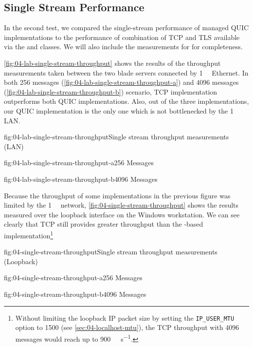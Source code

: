 \subsection{Single Stream Performance}

In the second test, we compared the single-stream performance of managed QUIC implementations to the
performance of combination of TCP and TLS available via the \TcpClient{} and \SslStream{} \dotnet{}
classes. We will also include the measurements for \libmsquic{} for completeness.

\autoref{fig:04-lab-single-stream-throughput} shows the results of the throughput measurements taken
between the two blade servers connected by \SI{1}{\giga\bit} Ethernet. In both \SI{256}{\byte}
messages (\autoref{fig:04-lab-single-stream-throughput-a}) and \SI{4096}{\byte} messages
(\autoref{fig:04-lab-single-stream-throughput-b}) scenario, TCP implementation outperforms both QUIC
implementations. Also, out of the three implementations, our QUIC implementation is the only one
which is not bottlenecked by the \SI{1}{\giga\bit} LAN\@.

\begin{myFigure}{fig:04-lab-single-stream-throughput}{Single stream throughput measurements (LAN)}
\begin{mySubfigure}{0.49\linewidth}{fig:04-lab-single-stream-throughput-a}{\SI{256}{\byte} Messages}
\footnotesize

\end{mySubfigure}
\begin{mySubfigure}{0.49\linewidth}{fig:04-lab-single-stream-throughput-b}{\SI{4096}{\byte} Messages}
\footnotesize

\end{mySubfigure}
\end{myFigure}

Because the throughput of some implementations in the previous figure was limited by the
\SI{1}{\giga\bit} network, \autoref{fig:04-single-stream-throughput} shows the results measured over
the loopback interface on the Windows workstation. We can see clearly that TCP still provides
greater throughput than the \libmsquic{}-based implementation\footnote{Without limiting the loopback
  IP packet size by setting the \texttt{IP_USER_MTU} option to 1500 (see
  \autoref{sec:04-localhost-mtu}), the TCP throughput with \SI{4096}{\byte} messages would reach up
  to \SI[per-mode=symbol]{900}{\mebi\byte\per\second}.}

\begin{myFigure}{fig:04-single-stream-throughput}{Single stream throughput measurements (Loopback)}
\begin{mySubfigure}{0.49\linewidth}{fig:04-single-stream-throughput-a}{\SI{256}{\byte} Messages}
\footnotesize

\end{mySubfigure}
\begin{mySubfigure}{0.49\linewidth}{fig:04-single-stream-throughput-b}{\SI{4096}{\byte} Messages}
\footnotesize

\end{mySubfigure}
\end{myFigure}

